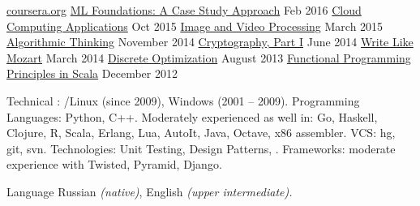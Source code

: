 \documentclass[unicode, 10pt, a4paper, oneside, fleqn]{article}
\begin{document}
\begin{minipage}[t]{0.50\textwidth}
\setlength\abovedisplayskip{0pt}
\courseplatform
    {\href{http://www.coursera.org}{coursera.org}}
    {}
    {
        \course
            {\href{}
                  {ML Foundations: A Case Study Approach}}
            {Feb 2016}
            {}
        \course
            {\href{}
                  {Cloud Computing Applications}}
            {Oct 2015}
            {}
        \course
            {\href{https://drive.google.com/file/d/0B2cptPgckn74MGQ5SUVQRGVDNE0/view}
                  {Image and Video Processing}}
            {March 2015}
            {}
        \course
            {\href{https://drive.google.com/file/d/0B2cptPgckn74ZkIwTWNFYUx6STA/view?usp=sharing}
                  {Algorithmic Thinking}}
            {November 2014}
            {}
        \course
            {\href{https://drive.google.com/file/d/0B2cptPgckn74OWlrVEZlR3U3azQ/edit?usp=sharing}
                  {Cryptography, Part I}}
            {June 2014}
            {}
        \course
            {\href{https://drive.google.com/file/d/0B2cptPgckn74WHJkQkNTdnN4dVU/edit?usp=sharing}
                  {Write Like Mozart}}
            {March 2014}
            {}
        \course
            {\href{https://docs.google.com/file/d/0B2cptPgckn74ZnN0Znhnd3ZUejg/edit?usp=sharing}
                  {Discrete Optimization}}
            {August 2013}
            {}
        \course
            {\href{https://docs.google.com/document/d/1AWaukQ0K4C-ZcuRRqYANJuYDOPxYH7MoVdXYKHPYJ8I/edit}
                  {Functional Programming Principles in Scala}}
            {December 2012}
            {}
    }
\end{minipage}



\inlineheadsection  %
    {Technical}
    {
        : /Linux (since 2009), Windows (2001 -- 2009).
        Programming Languages: Python, C++.
        Moderately experienced as well in: Go, Haskell, Clojure, R, Scala,
        Erlang, Lua, AutoIt, Java, Octave, x86 assembler.
        VCS: hg, git, svn.
        Technologies: Unit Testing, Design Patterns, .
        Frameworks: moderate experience with Twisted, Pyramid, Django.
    }

\inlineheadsection
    {Language}
    {
        Russian \emph{(native)}, English \emph{(upper intermediate).}
    }

%
%
\end{document}
